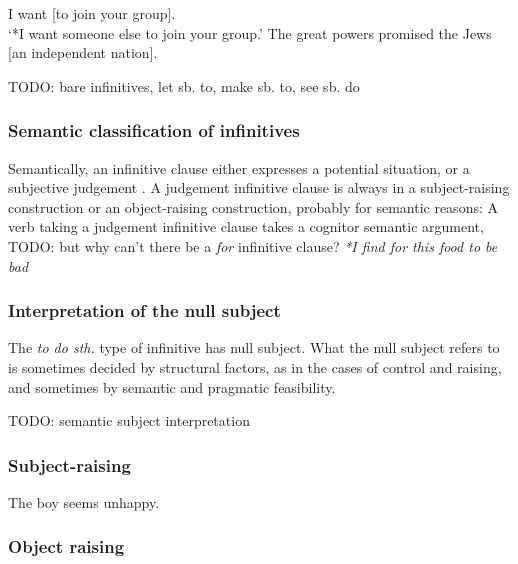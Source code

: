 \documentclass[UTF8, a4paper, oneside, scheme=plain]{ctexrep}
\newcommand*{\citepage}[1]{p.~{#1}}
\newcommand{\corpus}[1]{\emph{#1}}
\newcommand{\translate}[1]{`#1'}
\begin{document}
\begin{exe}
    \ex\label{ex:complement.infinitive.preference-control-reading} I want [to join your group]. \\
    \translate{*I want someone else to join your group.}
    \ex\label{ex:complement.infinitive.promise-np-object} The great powers promised the Jews [an independent nation].
\end{exe}

TODO: bare infinitives, let sb. to, make sb. to, see sb. do \citet[\citepage{1236},\citepage{1254}]{cgel}

\subsubsection{Semantic classification of infinitives}

Semantically, an infinitive clause either expresses a potential situation,
or a subjective judgement \citep[\citepage{245}]{dixon2005semantic}.
A judgement infinitive clause 
is always in a subject-raising construction or an object-raising construction,
probably for semantic reasons:
A verb taking a judgement infinitive clause 
takes a cognitor semantic argument,
TODO: but why can't there be a \corpus{for} infinitive clause? 
\corpus{*I find for this food to be bad}

\subsubsection{Interpretation of the null subject}

The \corpus{to do sth.} type of infinitive has null subject.
What the null subject refers to is sometimes decided by structural factors,
as in the cases of control and raising,
and sometimes by semantic and pragmatic feasibility.

TODO: semantic subject interpretation



\subsubsection{Subject-raising}

\begin{exe}
    \ex The boy seems unhappy.
\end{exe}

\subsubsection{Object raising}
\end{document}
